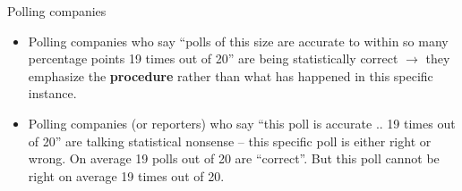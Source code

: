 \documentclass[handout]{beamer}\usepackage[]{graphicx}\usepackage[]{color}
\begin{document}
\begin{frame}{Polling companies}
\begin{itemize}
					\setlength\itemsep{2em}
	\item Polling companies who say ``polls of this size are accurate to within so many percentage points 19 times out of 20'' are being statistically correct $\to$ they emphasize the \textbf{procedure} rather than what has happened in this specific instance. \pause 
	\item Polling companies (or reporters) who say ``this poll is accurate .. 19
	times out of 20'' are talking statistical nonsense -- this specific poll is either right or wrong. On average 19 polls out of 20 are ``correct''. But this
	poll cannot be right on average 19 times out of 20.
\end{itemize}
\end{frame}

\end{document}
